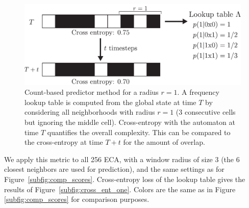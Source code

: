\begin{figure}[htbp]
  \centering
  \includegraphics[width=.8\linewidth]{figures/schema-count}
  \caption{Count-based predictor method for a radius $r=1$. A
    frequency lookup table is computed from the global state at time $T$ by
    considering all neighborhoods with radius $r=1$ (3 consecutive cells
    but ignoring the middle cell). Cross-entropy with the automaton at time $T$
    quantifies the overall complexity. This can be compared to the cross-entropy
    at time $T + t$ for the amount of overlap.}
  \label{fig:schema-count}
\end{figure}

We apply this metric to all 256 ECA, with a window radius of size 3 (the 6
closest neighbors are used for prediction), and the same settings as for
Figure~\ref{subfig:comp_scores}. Cross-entropy loss of the lookup table gives
the results of Figure~\ref{subfig:cross_ent_one}. Colors are the same as in
Figure \ref{subfig:comp_scores} for comparison purposes.


